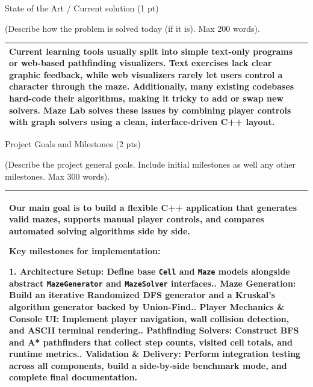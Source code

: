 \documentclass[12pt,a4paper]{article}
\newcommand{\secthead}[2]{%
  {\fontsize{18}{21.9}\selectfont\color{geheading}#1\par}\vspace{1.6pt}%
  {\fontsize{10.5}{14.5}\selectfont\color{gehint}#2\par}%
  \vspace{\secgap}}
\newlength{\secgap}\setlength{\secgap}{5.7pt}
\newcommand{\afterbox}{\vspace{\aftergap}}
\newlength{\aftergap}\setlength{\aftergap}{16pt}
\newenvironment{answerbox}{%
  \noindent\begin{tabular}{|p{485.1pt}|}\hline
  \fontsize{11}{13.6}\selectfont\setlength{\parskip}{4pt}\rule{0pt}{22.5pt}\ignorespaces}{%
  \rule[-16pt]{0pt}{0pt}\\\hline\end{tabular}\par}
\begin{document}
\secthead{State of the Art / Current solution (1 pt)}{(Describe how the problem is solved today (if it is). Max 200 words).}
\begin{answerbox}
Current learning tools usually split into simple text-only programs or web-based pathfinding visualizers. Text exercises lack clear graphic feedback, while web visualizers rarely let users control a character through the maze. Additionally, many existing codebases hard-code their algorithms, making it tricky to add or swap new solvers. Maze Lab solves these issues by combining player controls with graph solvers using a clean, interface-driven C++ layout.
\end{answerbox}
\afterbox

\secthead{Project Goals and Milestones (2 pts)}{(Describe the project general goals. Include initial milestones as well any other milestones. Max 300 words).}
\begin{answerbox}
Our main goal is to build a flexible C++ application that generates valid mazes, supports manual player controls, and compares automated solving algorithms side by side.

Key milestones for implementation:
\par\vspace{2pt}
1. \textbf{Architecture Setup:} Define base \texttt{Cell} and \texttt{Maze} models alongside abstract \texttt{MazeGenerator} and \texttt{MazeSolver} interfaces.\newline
2. \textbf{Maze Generation:} Build an iterative Randomized DFS generator and a Kruskal's algorithm generator backed by Union-Find.\newline
3. \textbf{Player Mechanics \& Console UI:} Implement player navigation, wall collision detection, and ASCII terminal rendering.\newline
4. \textbf{Pathfinding Solvers:} Construct BFS and A* pathfinders that collect step counts, visited cell totals, and runtime metrics.\newline
5. \textbf{Validation \& Delivery:} Perform integration testing across all components, build a side-by-side benchmark mode, and complete final documentation.
\end{answerbox}
\end{document}
